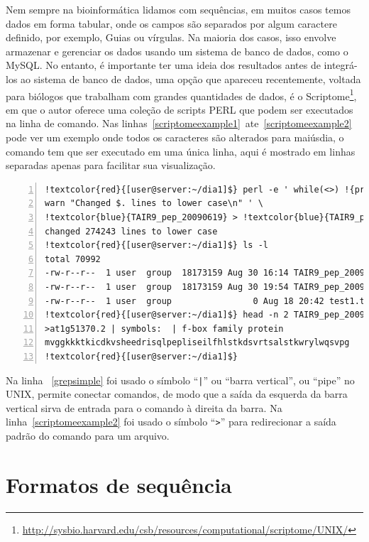 \documentclass[letter,11pt]{book}
\begin{document}
Nem sempre na bioinformática lidamos com sequências, em muitos casos temos dados em forma tabular, onde os campos são separados por algum caractere definido, por exemplo, Guias ou vírgulas. Na maioria dos casos, isso envolve armazenar e gerenciar os dados usando um sistema de banco de dados, como o MySQL. No entanto, é importante ter uma ideia dos resultados antes de integrá-los ao sistema de banco de dados, uma opção que apareceu recentemente, voltada para biólogos que trabalham com grandes quantidades de dados, é o Scriptome\footnote{\url{http://sysbio.harvard.edu/csb/resources/computational/scriptome/UNIX/}}, em que o autor oferece uma coleção de scripts PERL que podem ser executados na linha de comando. Nas linhas~\ref{scriptomeexample1}~ate~\ref{scriptomeexample2} pode ver um exemplo onde todos os caracteres são alterados para maiúsdia, o comando tem que ser executado em uma única linha, aqui é mostrado em linhas separadas apenas para facilitar sua visualização.

\begin{Verbatim}[commandchars=!\{\},numbers=left,firstnumber=last,label=Exemplo do Scriptome,frame=topline,fontsize=\scriptsize]
!textcolor{red}{[user@server:~/dia1]$} perl -e ' while(<>) !{print lc($_);!} \  !label{scriptomeexample1}
warn "Changed $. lines to lower case\n" ' \
!textcolor{blue}{TAIR9_pep_20090619} > !textcolor{blue}{TAIR9_pep_20090619.lc}    !label{scriptomeexample2}
changed 274243 lines to lower case
!textcolor{red}{[user@server:~/dia1]$} ls -l
total 70992
-rw-r--r--  1 user  group  18173159 Aug 30 16:14 TAIR9_pep_20090619
-rw-r--r--  1 user  group  18173159 Aug 30 19:54 TAIR9_pep_20090619.lc
-rw-r--r--  1 user  group                0 Aug 18 20:42 test1.txt
!textcolor{red}{[user@server:~/dia1]$} head -n 2 TAIR9_pep_20090619.lc
>at1g51370.2 | symbols:  | f-box family protein
mvggkkktkicdkvsheedrisqlpepliseilfhlstkdsvrtsalstkwrylwqsvpg
!textcolor{red}{[user@server:~/dia1]$} 
\end{Verbatim} 

Na linha ~\ref{grepsimple} foi usado o símbolo ``\Verb+|+'' ou ``barra vertical'', ou ``pipe'' no UNIX, permite conectar comandos, de modo que a saída da esquerda da barra vertical sirva de entrada para o comando à direita da barra. Na linha~\ref{scriptomeexample2} foi usado o símbolo ``\Verb+>+'' para redirecionar a saída padrão do comando para um arquivo.

\section{Formatos de sequência\label{sequenceformats}}
\end{document}

